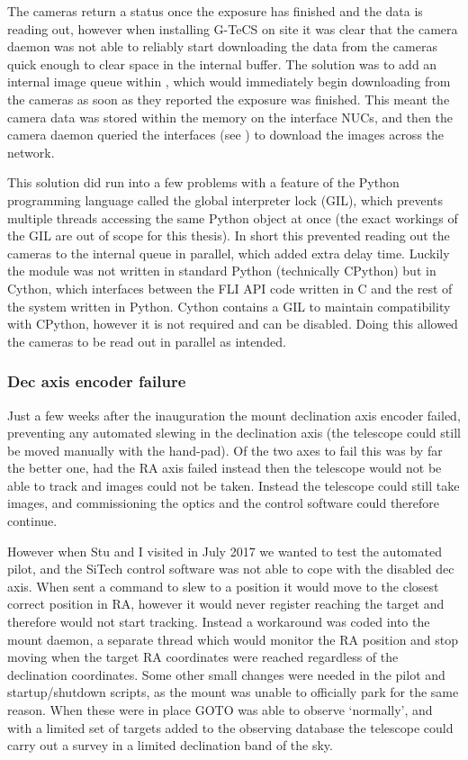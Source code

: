 \begin{colsection}
\begin{colsection}
The cameras return a  status once the exposure has finished and the data is reading out, however when installing G-TeCS on site it was clear that the camera daemon was not able to reliably start downloading the data from the cameras quick enough to clear space in the internal buffer. The solution was to add an internal image queue within , which would immediately begin downloading from the cameras as soon as they reported the exposure was finished. This meant the camera data was stored within the memory on the interface NUCs, and then the camera daemon queried the  interfaces (see ) to download the images across the network.

This solution did run into a few problems with a feature of the Python programming language called the global interpreter lock (GIL), which prevents multiple threads accessing the same Python object at once (the exact workings of the GIL are out of scope for this thesis). In short this prevented reading out the cameras to the internal queue in parallel, which added extra delay time. Luckily the  module was not written in standard Python (technically CPython) but in Cython, which interfaces between the FLI API code written in C and the rest of the system written in Python. Cython contains a GIL to maintain compatibility with CPython, however it is not required and can be disabled. Doing this allowed the cameras to be read out in parallel as intended.

\subsubsection{Dec axis encoder failure}

Just a few weeks after the inauguration the mount declination axis encoder failed, preventing any automated slewing in the declination axis (the telescope could still be moved manually with the hand-pad). Of the two axes to fail this was by far the better one, had the RA axis failed instead then the telescope would not be able to track and images could not be taken. Instead the telescope could still take images, and commissioning the optics and the control software could therefore continue.

However when Stu and I visited in July 2017 we wanted to test the automated pilot, and the SiTech control software was not able to cope with the disabled dec axis. When sent a command to slew to a position it would move to the closest correct position in RA, however it would never register reaching the target and therefore would not start tracking. Instead a workaround was coded into the mount daemon, a separate thread which would monitor the RA position and stop moving when the target RA coordinates were reached regardless of the declination coordinates. Some other small changes were needed in the pilot and startup/shutdown scripts, as the mount was unable to officially park for the same reason. When these were in place GOTO was able to observe `normally', and with a limited set of targets added to the observing database the telescope could carry out a survey in a limited declination band of the sky.


\end{colsection}
\end{colsection}
